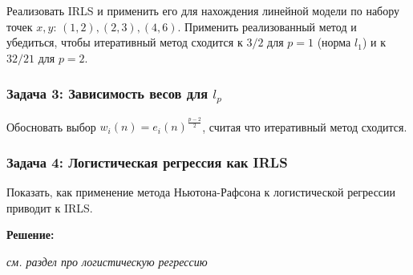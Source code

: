 \documentclass{article}
\begin{document}
Реализовать IRLS и применить его для нахождения линейной модели по набору точек $x, y$: $(1, 2), (2, 3), (4, 6)$. Применить реализованный метод и убедиться, чтобы итеративный метод сходится к $3 / 2$ для $p = 1$ (норма $l_1$) и к $32 / 21$ для $p = 2$.

\subsubsection{Задача 3: Зависимость весов для $l_p$}

Обосновать выбор $w_i(n) = e_i(n)^{\frac{p - 2}{2}}$, считая что итеративный метод сходится.

\subsubsection{Задача 4: Логистическая регрессия как IRLS}

Показать, как применение метода Ньютона-Рафсона к логистической регрессии приводит к IRLS.

\textbf{Решение:}

\textit{см. раздел про логистическую регрессию}
\end{document}
